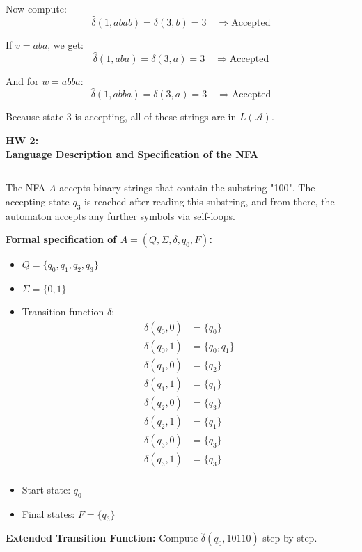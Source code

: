 \documentclass{article}
\theoremstyle{theorem}
\theoremstyle{definition}
\theoremstyle{remark}
\begin{document}
Now compute:
\[
\hat{\delta}(1, abab) = \delta(3, b) = 3 \quad \Rightarrow \text{Accepted}
\]

If \( v = aba \), we get:
\[
\hat{\delta}(1, aba) = \delta(3, a) = 3 \quad \Rightarrow \text{Accepted}
\]

And for \( w = abba \):
\[
\hat{\delta}(1, abba) = \delta(3, a) = 3 \quad \Rightarrow \text{Accepted}
\]

Because state 3 is accepting, all of these strings are in \( L(\mathcal{A}) \).


\textbf{HW 2:} \\
\textbf{Language Description and Specification of the NFA}

\vspace{0.5em}
\hrule
\vspace{0.5em}

The NFA \( A \) accepts binary strings that contain the substring "100". The accepting state \( q_3 \) is reached after reading this substring, and from there, the automaton accepts any further symbols via self-loops.

\textbf{Formal specification of \( A = (Q, \Sigma, \delta, q_0, F) \):}
\begin{itemize}
    \item \( Q = \{ q_0, q_1, q_2, q_3 \} \)
    \item \( \Sigma = \{ 0, 1 \} \)
    \item Transition function \( \delta \):
    \[
    \begin{aligned}
        \delta(q_0, 0) &= \{ q_0 \} \\
        \delta(q_0, 1) &= \{ q_0, q_1 \} \\
        \delta(q_1, 0) &= \{ q_2 \} \\
        \delta(q_1, 1) &= \{ q_1 \} \\
        \delta(q_2, 0) &= \{ q_3 \} \\
        \delta(q_2, 1) &= \{ q_1 \} \\
        \delta(q_3, 0) &= \{ q_3 \} \\
        \delta(q_3, 1) &= \{ q_3 \} \\
    \end{aligned}
    \]
    \item Start state: \( q_0 \)
    \item Final states: \( F = \{ q_3 \} \)
\end{itemize}

\vspace{1em}
\textbf{Extended Transition Function:} Compute \( \hat{\delta}(q_0, 10110) \) step by step.
\end{document}

